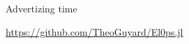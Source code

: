\documentclass[10pt]{beamer}
\begin{document}
\begin{frame}[fragile]{Advertizing time}
  \begin{center}
    \url{https://github.com/TheoGuyard/El0ps.jl}


  \end{center}
\end{frame}







\end{document}
